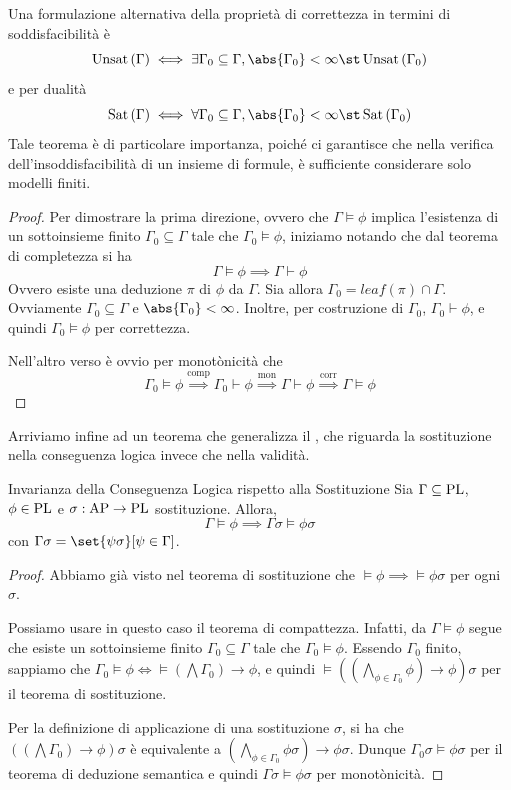 Una formulazione alternativa della proprietà di correttezza in termini di soddisfacibilità è
\[\Unsat[\Gamma] \iff \exists \Gamma_0 \subseteq \Gamma, \abs{\Gamma_0} < \infty\st \Unsat[\Gamma_0]\]
e per dualità
\[\Sat[\Gamma] \iff \forall \Gamma_0 \subseteq \Gamma, \abs{\Gamma_0} < \infty \st \Sat[\Gamma_0]\]
Tale teorema è di particolare importanza, poiché ci garantisce che nella verifica dell'insoddisfacibilità di un insieme di formule, è sufficiente considerare solo modelli finiti.

\begin{proof}
  Per dimostrare la prima direzione, ovvero che \(\Gamma\models\phi\) implica l'esistenza di un sottoinsieme finito \(\Gamma_0\subseteq\Gamma\) tale che \(\Gamma_0\models\phi\), iniziamo notando che dal teorema di completezza si ha
  \[\Gamma \models \phi \implies \Gamma \vdash \phi\]
  Ovvero esiste una deduzione \(\pi\) di \(\phi\) da \(\Gamma\).
  Sia allora \(\Gamma_0 = leaf(\pi)\cap \Gamma\). Ovviamente \(\Gamma_0\subseteq\Gamma\) e \(\abs{\Gamma_0}<\infty\).
  Inoltre, per costruzione di \(\Gamma_0\), \(\Gamma_0\vdash\phi\), e quindi \(\Gamma_0\models\phi\) per correttezza.

  Nell'altro verso è ovvio per monotònicità che
  \[\Gamma_0\models\phi\overset{\text{comp}}{\implies}\Gamma_0\vdash\phi\overset{\text{mon}}{\implies}\Gamma\vdash\phi\overset{\text{corr}}{\implies}\Gamma\models\phi\]
\end{proof}

Arriviamo infine ad un teorema che generalizza il , che riguarda la sostituzione nella conseguenza logica invece che nella validità.

\begin{theorem}{Invarianza della Conseguenza Logica rispetto alla Sostituzione}
  Sia \(\Gamma \subseteq \operatorname{PL}\), \(\phi \in \operatorname{PL}\) e \(\sigma:\AP \to \PL\) sostituzione. Allora,
  \[\Gamma\models\phi\implies\Gamma\sigma\models\phi\sigma\]
  con \(\Gamma\sigma = \set{\psi\sigma}[\psi\in\Gamma]\).
\end{theorem}

\begin{proof}
  Abbiamo già visto nel teorema di sostituzione che \(\models\phi \implies \models\phi\sigma\) per ogni \(\sigma\).

  Possiamo usare in questo caso il teorema di compattezza. Infatti, da \(\Gamma\models\phi\) segue che esiste un sottoinsieme finito \(\Gamma_0 \subseteq \Gamma\) tale che \(\Gamma_0\models\phi\).
  Essendo \(\Gamma_0\) finito, sappiamo che \(\Gamma_0\models\phi\iff\models(\bigwedge\Gamma_0)\to\phi\), e quindi \(\models((\bigwedge_{\phi\in\Gamma_0}\phi)\to\phi)\sigma\) per il teorema di sostituzione.

  Per la definizione di applicazione di una sostituzione \(\sigma\), si ha che \(((\bigwedge\Gamma_0)\to\phi)\sigma\) è equivalente a \((\bigwedge_{\phi\in\Gamma_0}\phi\sigma)\to\phi\sigma\).
  Dunque \(\Gamma_0\sigma\models\phi\sigma\) per il teorema di deduzione semantica e quindi \(\Gamma\sigma\models\phi\sigma\) per monotònicità.
\end{proof}

